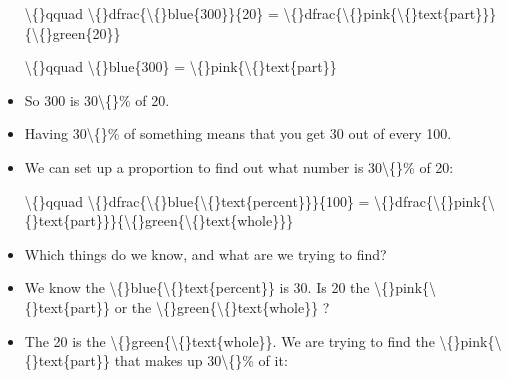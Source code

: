 \documentclass{article}
\begin{document}
\begin{itemize}
                        
                            \textbackslash\{\}qquad \textbackslash\{\}dfrac\{\textbackslash\{\}blue\{300\}\}\{20\} =
                            \textbackslash\{\}dfrac\{\textbackslash\{\}pink\{\textbackslash\{\}text\{part\}\}\}\{\textbackslash\{\}green\{20\}\}
                        
                        \textbackslash\{\}qquad \textbackslash\{\}blue\{300\} = \textbackslash\{\}pink\{\textbackslash\{\}text\{part\}\}
  \item So 300 is 30\textbackslash\{\}\% of 20.
  \item Having 30\textbackslash\{\}\% of something means that you get
                        30 out of every 100.
  \item We can set up a proportion to find out what number is
                            30\textbackslash\{\}\% of 20:
                        
                        
                            \textbackslash\{\}qquad \textbackslash\{\}dfrac\{\textbackslash\{\}blue\{\textbackslash\{\}text\{percent\}\}\}\{100\} =
                            \textbackslash\{\}dfrac\{\textbackslash\{\}pink\{\textbackslash\{\}text\{part\}\}\}\{\textbackslash\{\}green\{\textbackslash\{\}text\{whole\}\}\}
  \item Which things do we know, and what are we trying to find?
  \item We know the \textbackslash\{\}blue\{\textbackslash\{\}text\{percent\}\} is 30.
                        Is 20 the \textbackslash\{\}pink\{\textbackslash\{\}text\{part\}\}
                        or the \textbackslash\{\}green\{\textbackslash\{\}text\{whole\}\}
                    ?
  \item The 20 is the \textbackslash\{\}green\{\textbackslash\{\}text\{whole\}\}.
                            We are trying to find the \textbackslash\{\}pink\{\textbackslash\{\}text\{part\}\}
                            that makes up 30\textbackslash\{\}\% of it:
                        

\end{itemize}
\end{document}
